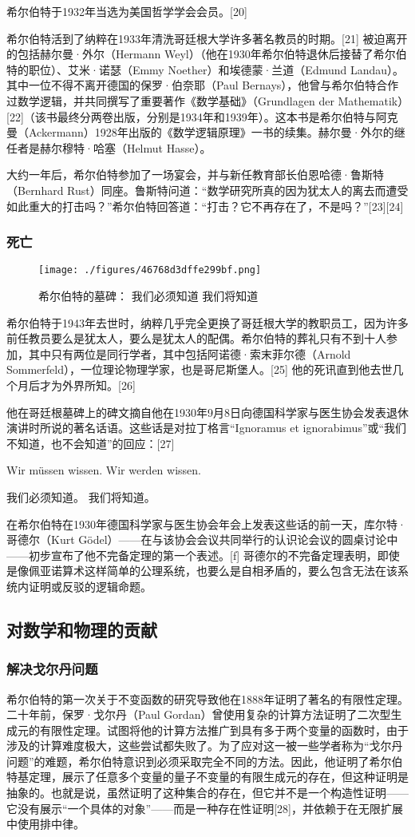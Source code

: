 希尔伯特于1932年当选为美国哲学学会会员。[20]

希尔伯特活到了纳粹在1933年清洗哥廷根大学许多著名教员的时期。[21] 被迫离开的包括赫尔曼·外尔（Hermann Weyl）（他在1930年希尔伯特退休后接替了希尔伯特的职位）、艾米·诺瑟（Emmy Noether）和埃德蒙·兰道（Edmund Landau）。其中一位不得不离开德国的保罗·伯奈耶（Paul Bernays），他曾与希尔伯特合作过数学逻辑，并共同撰写了重要著作《数学基础》（Grundlagen der Mathematik）[22]（该书最终分两卷出版，分别是1934年和1939年）。这本书是希尔伯特与阿克曼（Ackermann）1928年出版的《数学逻辑原理》一书的续集。赫尔曼·外尔的继任者是赫尔穆特·哈塞（Helmut Hasse）。

大约一年后，希尔伯特参加了一场宴会，并与新任教育部长伯恩哈德·鲁斯特（Bernhard Rust）同座。鲁斯特问道：“数学研究所真的因为犹太人的离去而遭受如此重大的打击吗？”希尔伯特回答道：“打击？它不再存在了，不是吗？”[23][24]
\subsubsection{死亡}
\begin{figure}[ht]
\centering
\texttt{[image: ./figures/46768d3dffe299bf.png]}
\caption{希尔伯特的墓碑： 我们必须知道  我们将知道} \label{fig_David_8}
\end{figure}
希尔伯特于1943年去世时，纳粹几乎完全更换了哥廷根大学的教职员工，因为许多前任教员要么是犹太人，要么是犹太人的配偶。希尔伯特的葬礼只有不到十人参加，其中只有两位是同行学者，其中包括阿诺德·索末菲尔德（Arnold Sommerfeld），一位理论物理学家，也是哥尼斯堡人。[25] 他的死讯直到他去世几个月后才为外界所知。[26]

他在哥廷根墓碑上的碑文摘自他在1930年9月8日向德国科学家与医生协会发表退休演讲时所说的著名话语。这些话是对拉丁格言“Ignoramus et ignorabimus”或“我们不知道，也不会知道”的回应：[27]

Wir müssen wissen.  
Wir werden wissen.

我们必须知道。  
我们将知道。

在希尔伯特在1930年德国科学家与医生协会年会上发表这些话的前一天，库尔特·哥德尔（Kurt Gödel）——在与该协会会议共同举行的认识论会议的圆桌讨论中——初步宣布了他不完备定理的第一个表述。[f] 哥德尔的不完备定理表明，即使是像佩亚诺算术这样简单的公理系统，也要么是自相矛盾的，要么包含无法在该系统内证明或反驳的逻辑命题。
\subsection{对数学和物理的贡献}
\subsubsection{解决戈尔丹问题}  
希尔伯特的第一次关于不变函数的研究导致他在1888年证明了著名的有限性定理。二十年前，保罗·戈尔丹（Paul Gordan）曾使用复杂的计算方法证明了二次型生成元的有限性定理。试图将他的计算方法推广到具有多于两个变量的函数时，由于涉及的计算难度极大，这些尝试都失败了。为了应对这一被一些学者称为“戈尔丹问题”的难题，希尔伯特意识到必须采取完全不同的方法。因此，他证明了希尔伯特基定理，展示了任意多个变量的量子不变量的有限生成元的存在，但这种证明是抽象的。也就是说，虽然证明了这种集合的存在，但它并不是一个构造性证明——它没有展示“一个具体的对象”——而是一种存在性证明[28]，并依赖于在无限扩展中使用排中律。

